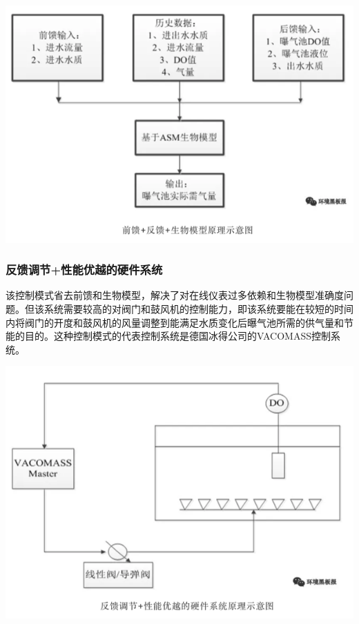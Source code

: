 \documentclass[]{book}
\begin{document}
\includegraphics[width=8.33in]{images/bq4}

\hypertarget{ux53cdux9988ux8c03ux8282ux6027ux80fdux4f18ux8d8aux7684ux786cux4ef6ux7cfbux7edf}{%
\subsubsection{反馈调节+性能优越的硬件系统}\label{ux53cdux9988ux8c03ux8282ux6027ux80fdux4f18ux8d8aux7684ux786cux4ef6ux7cfbux7edf}}

该控制模式省去前馈和生物模型，解决了对在线仪表过多依赖和生物模型准确度问题。但该系统需要较高的对阀门和鼓风机的控制能力，即该系统要能在较短的时间内将阀门的开度和鼓风机的风量调整到能满足水质变化后曝气池所需的供气量和节能的目的。这种控制模式的代表控制系统是德国冰得公司的VACOMASS控制系统。

\includegraphics[width=8.33in]{images/bq5}
\end{document}
